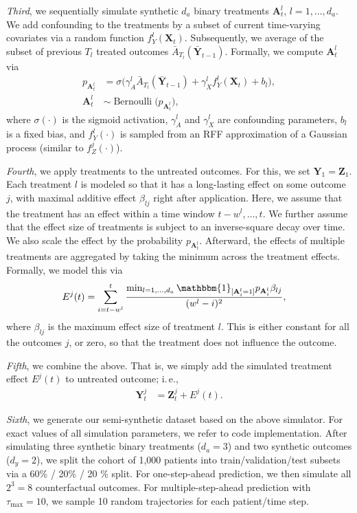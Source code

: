 \documentclass{article}
\newcommand\ie{i.\,e.\xspace}
\theoremstyle{plain}
\theoremstyle{definition}
\theoremstyle{remark}
\begin{document}
\emph{Third}, we sequentially simulate synthetic $d_a$ binary treatments $\mathbf{A}_{t}^{l}$, $l = 1, \dots, d_a$. We add confounding to the treatments by a subset of current time-varying covariates via a random function $f_Y^l(\mathbf{X}_{t})$. Subsequently, we average of the subset of previous $T_l$ treated outcomes $\bar{A}_{T_l}(\bar{\mathbf{Y}}_{t-1})$. Formally, we compute $\mathbf{A}_{t}^{l}$ via
\begin{align}
    p_{\mathbf{A}_{t}^{l}} & =  \sigma \Big( \gamma_A^l \bar{A}_{T_l}( \bar{\mathbf{Y}}_{t-1}) + \gamma_X^l f_Y^l(\mathbf{X}_{t}) +  b_l \Big), \\
    \mathbf{A}_{t}^{l} & \sim \operatorname{Bernoulli}\big( p_{\mathbf{A}_{t}^{l}} \big) ,
\end{align}
where $\sigma(\cdot)$ is the sigmoid activation, $ \gamma_A^l$ and $\gamma_X^l$ are confounding parameters, $b_l$ is a fixed bias, and $f_Y^l(\cdot)$ is sampled from an RFF approximation of a Gaussian process (similar to $f_Z^j(\cdot)$).

\emph{Fourth}, we apply treatments to the untreated outcomes. For this, we set $\mathbf{Y}_1 = \mathbf{Z}_1$. Each treatment $l$ is modeled so that it has a long-lasting effect on some outcome $j$, with maximal additive effect $\beta_{lj}$ right after application. Here, we assume that the treatment has an effect within a time window $t - w^l, \dots, t$. We further assume that the effect size of treatments is subject to an inverse-square decay over time. We also scale the effect by the probability $p_{\mathbf{A}_{t}^{l}}$. Afterward, the effects of multiple treatments are aggregated by taking the minimum across the treatment effects. Formally, we model this via
\begin{align}
    E^{j}(t) & = \sum_{i=t-w^l}^{t} \frac{\min_{l=1,\dots, d_a} \mathbbm{1}_{[\mathbf{A}_{i}^{l} = 1]} p_{\mathbf{A}_{i}^{l}} \beta_{lj}}{(w^l - i)^2} ,
\end{align} 
where $\beta_{lj}$ is the maximum effect size of treatment $l$. This is either constant for all the outcomes $j$, or zero, so that the treatment does not influence the outcome.   

\emph{Fifth}, we combine the above. That is, we simply add the simulated treatment effect $E^{j}(t)$ to untreated outcome; \ie,
\begin{align}
    \mathbf{Y}_{t}^j & = \mathbf{Z}_{t}^j + E^{j}(t) .
\end{align}

\emph{Sixth}, we generate our semi-synthetic dataset based on the above simulator. For exact values of all simulation parameters, we refer to code implementation. After simulating three synthetic binary treatments ($d_a = 3$) and two synthetic outcomes ($d_y = 2$), we split the cohort of 1,000 patients into train/validation/test subsets via a 60\% / 20\% / 20 \% split. For one-step-ahead prediction, we then simulate all $2^3 = 8$ counterfactual outcomes. For multiple-step-ahead prediction with $\tau_{\text{max}} = 10$, we sample 10 random trajectories for each patient/time step. 
\end{document}
